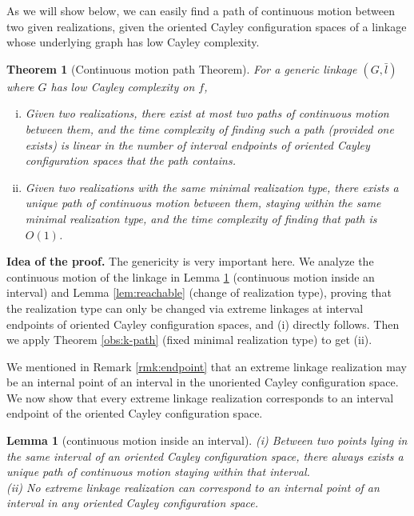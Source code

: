 \documentclass[secthm,amsthm,english]{article}
\newtheorem{theorem}{Theorem}
\newtheorem{lemma}{Lemma}
\theoremstyle{definition}
\theoremstyle{remark}
\begin{document}
As we will show below, 
we can easily find a path of continuous motion between two given realizations, 
given the oriented Cayley configuration spaces of a linkage 
whose underlying graph has low Cayley complexity. 

\begin{theorem}[Continuous motion path Theorem] \label{theo:path}
For a generic linkage $(G, \bar{l})$ where $G$ has low Cayley complexity on $f$, 
\begin{enumerate}[(i)]
	\item Given two realizations, 
	there exist \emph{at most two} paths of continuous motion between them, 
	and the time complexity of finding such a path (provided one exists) is linear in the number of  
	interval endpoints of oriented Cayley configuration spaces that the path contains. 
	
	\item Given two realizations with the same minimal realization type, 
	there exists a unique path of continuous motion between them, 
	staying within the same minimal realization type, 
	and the time complexity of finding that path is $O(1)$. 
\end{enumerate}
\end{theorem}

\noindent \textbf{Idea of the proof. } 
The genericity is very important here. 
We analyze the continuous motion of the linkage in Lemma \ref{lem:endpoint} (continuous motion inside an interval) 
and Lemma \ref{lem:reachable} (change of realization type),
proving that the realization type can only be changed via extreme linkages at interval endpoints of oriented Cayley configuration spaces,
and (i) directly follows. 
Then we apply Theorem \ref{obs:k-path} (fixed minimal realization type) to get (ii). 



We mentioned in Remark \ref{rmk:endpoint} that
an extreme linkage realization may be an internal point 
of an interval in the unoriented Cayley configuration space. 
We now show that every extreme linkage realization corresponds to an interval endpoint 
of the oriented Cayley configuration space. 

\begin{lemma}[continuous motion inside an interval] \label{lem:endpoint}
(i) Between two points lying in the same interval of an oriented Cayley configuration space, 
there always exists a unique path of continuous motion staying within that interval. \\
(ii) No extreme linkage realization can correspond to an internal point of an interval in any oriented Cayley configuration space. 
\end{lemma}
\end{document}
